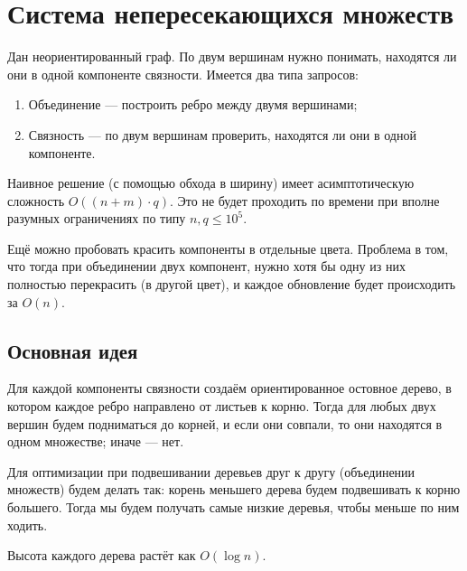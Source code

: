 \section{Система непересекающихся множеств}

\begin{problem}
    Дан неориентированный граф. По двум вершинам нужно понимать, находятся ли они в одной компоненте связности. Имеется два типа запросов:
    \begin{enumerate}[nolistsep]
        \item Объединение --- построить ребро между двумя вершинами;
        \item Связность --- по двум вершинам проверить, находятся ли они в одной компоненте.
    \end{enumerate}
\end{problem}

Наивное решение (с помощью обхода в ширину) имеет асимптотическую сложность $O((n + m) \cdot q)$. Это не будет проходить по времени при вполне разумных ограничениях по типу $n, q \leqslant 10^5$.

Ещё можно пробовать красить компоненты в отдельные цвета. Проблема в том, что тогда при объединении двух компонент, нужно хотя бы одну из них полностью перекрасить (в другой цвет), и каждое обновление будет происходить за $O(n)$.

\subsection{Основная идея}

Для каждой компоненты связности создаём ориентированное остовное дерево, в котором каждое ребро направлено от листьев к корню. Тогда для любых двух вершин будем подниматься до корней, и если они совпали, то они находятся в одном множестве; иначе --- нет.

Для оптимизации при подвешивании деревьев друг к другу (объединении множеств) будем делать так: корень меньшего дерева будем подвешивать к корню большего. Тогда мы будем получать самые низкие деревья, чтобы меньше по ним ходить.

\begin{theorem}
    Высота каждого дерева растёт как $O(\log n)$.
\end{theorem}

